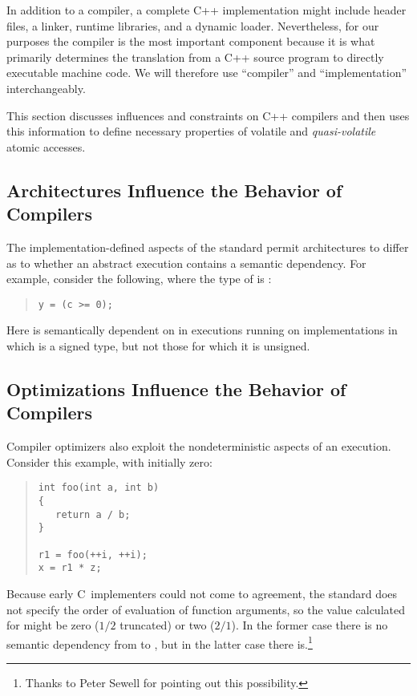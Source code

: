 In addition to a compiler, a complete C++ implementation might include
 header files, a linker, runtime libraries, and a dynamic loader.
Nevertheless, for our purposes the compiler is the most important
component because it is what primarily determines the translation from
a C++ source program to directly executable machine code.
We will therefore use ``compiler'' and ``implementation'' interchangeably.

This section discusses influences and constraints on C++ compilers
and then uses this information to define necessary properties of
volatile and \emph{quasi-volatile} atomic accesses.

\subsection{Architectures Influence the Behavior of Compilers}
\label{sec:Architectures Influence the Behavior of Compilers}

The implementation-defined aspects of the standard permit architectures to
differ as to whether an abstract execution contains a semantic dependency.
For example, consider the following, where the type of  is :
\begin{quote}
\begin{verbatim}
y = (c >= 0);
\end{verbatim}
\end{quote}
Here  is semantically dependent on  in executions
running on implementations in
which  is a signed type,
but not those for which it is unsigned.

\subsection{Optimizations Influence the Behavior of Compilers}
\label{sec:Optimizations Influence the Behavior of Compilers}

Compiler optimizers also exploit the nondeterministic aspects of an
execution.
Consider this example, with  initially zero:
\begin{quote}
\begin{verbatim}
int foo(int a, int b)
{
   return a / b;
}

r1 = foo(++i, ++i);
x = r1 * z;
\end{verbatim}
\end{quote}
Because early C~implementers could not come to agreement, the standard
does not specify the order of evaluation of function arguments, so
the value calculated for  might be zero ($1/2$ truncated) or two
($2/1$).
In the former case there is no semantic dependency from  to ,
but in the latter case there is.\footnote{
	Thanks to Peter Sewell for pointing out this possibility.}

